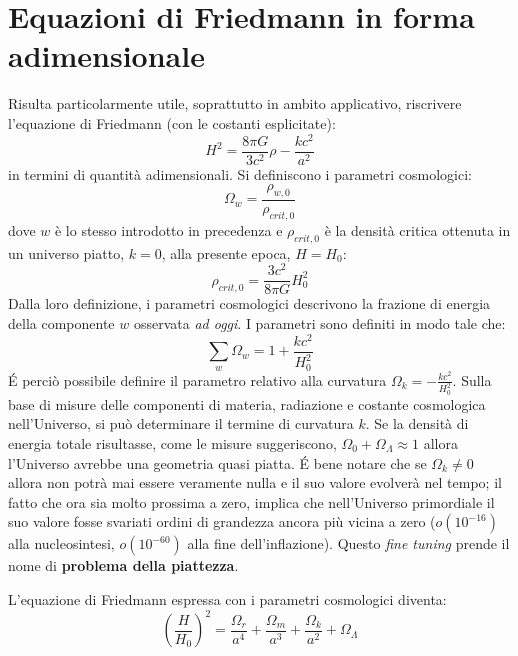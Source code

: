 \section{Equazioni di Friedmann in forma adimensionale}
Risulta particolarmente utile, soprattutto in ambito applicativo, riscrivere l'equazione di Friedmann (con le costanti esplicitate):
\begin{equation}
    H^2 = \frac{8\pi G}{3 c^2}\rho - \frac{kc^2}{ a^2}
\end{equation}
in termini di quantità adimensionali.  Si definiscono i parametri cosmologici:
\begin{equation}
    \Omega_w = \frac{\rho_{w,0}}{\rho_{crit, 0}}
\end{equation}
dove $w$ è lo stesso introdotto in precedenza e $\rho_{crit,0}$ è la densità critica ottenuta in un universo piatto, $k=0$, alla presente epoca, $H=H_0$:
\begin{equation}
    \rho_{crit,0} = \frac{3c^2}{8\pi G}H_0^2
\end{equation}
Dalla loro definizione, i parametri cosmologici descrivono la frazione di energia della componente $w$ osservata \textit{ad oggi}. 
I parametri sono definiti in modo tale che:
\begin{equation*}
    \sum_w \Omega_w = 1 + \frac{kc^2}{H_0^2}
\end{equation*}
\'E perciò possibile definire il parametro relativo alla curvatura $\Omega_k = - \frac{kc^2}{H_0^2}$. Sulla base di misure delle componenti di materia, radiazione e costante cosmologica nell'Universo, si può determinare il termine di curvatura $k$. Se la densità di energia totale risultasse, come le misure suggeriscono, $\Omega_0 + \Omega_\Lambda \approx 1$ allora l'Universo avrebbe una geometria quasi piatta. \'E bene notare che se $\Omega_k \neq 0$ allora non potrà mai essere veramente nulla e il suo valore evolverà nel tempo; il fatto che ora sia molto prossima a zero, implica che nell'Universo primordiale il suo valore fosse svariati ordini di grandezza ancora più vicina a zero ($o(10^{-16})$ alla nucleosintesi, $o(10^{-60})$ alla fine dell'inflazione). Questo \textit{fine tuning} prende il nome di \textbf{problema della piattezza}. 

L'equazione di Friedmann espressa con i parametri cosmologici diventa:
\begin{equation}
    \left(\frac{H}{H_0}\right)^2 = \frac{\Omega_r}{a^4} + \frac{\Omega_m}{a^3} + \frac{\Omega_k}{a^2} + \Omega_\Lambda
    \label{eq.friedmann_param_cosmologici}
\end{equation}
